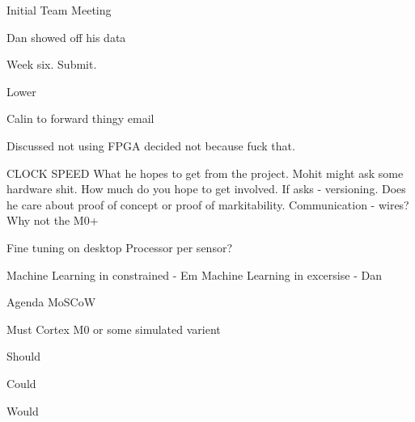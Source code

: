 \documentclass{article}
\begin{document}

\begin{Minutes}{Initial Team Meeting}
\starttime{16:00}
\endtime{16:30}
\maketitle

\topic{}
Dan showed off his data


Week six. Submit.

Lower

Calin to forward thingy email

Discussed not using FPGA decided not because fuck that. 

CLOCK SPEED
What he hopes to get from the project.
Mohit might ask some hardware shit.
How much do you hope to get involved.
If asks - versioning.
Does he care about proof of concept or proof of markitability.
Communication - wires?
Why not the M0+

Fine tuning on desktop
Processor per sensor?

Machine Learning in constrained - Em
Machine Learning in excersise - Dan

Agenda
MoSCoW

Must
Cortex M0 or some simulated varient

Should


Could


Would



\end{Minutes}
\end{document}
